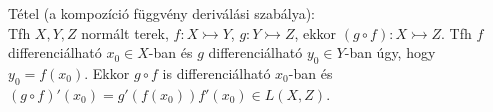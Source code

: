 \documentclass[12pt,a4paper]{scrartcl}
\newenvironment{tetel}{}{}
\newenvironment{bizonyitas}{}{}
\begin{document}
\begin{tetel}

Tétel (a kompozíció függvény deriválási szabálya):\\
Tfh \(X,Y,Z\) normált terek, \(\left. f:X\rightarrowtail Y \right.\),
\(\left. g:Y\rightarrowtail Z \right.\), ekkor
\(\left. \left( {g \circ f} \right):X\rightarrowtail Z \right.\). Tfh
\(f\) differenciálható \(x_{0} \in X\)-ban és \(g\) differenciálható
\(y_{0} \in Y\)-ban úgy, hogy \(y_{0} = f\left( x_{0} \right)\). Ekkor
\(g \circ f\) is differenciálható \(x_{0}\)-ban és
\(\left( {g \circ f} \right)'\left( x_{0} \right) = g'\left( {f\left( x_{0} \right)} \right)f'\left( x_{0} \right) \in L\left( {X,Z} \right)\).

\end{tetel}

\begin{bizonyitas}


\end{bizonyitas}
\end{document}
